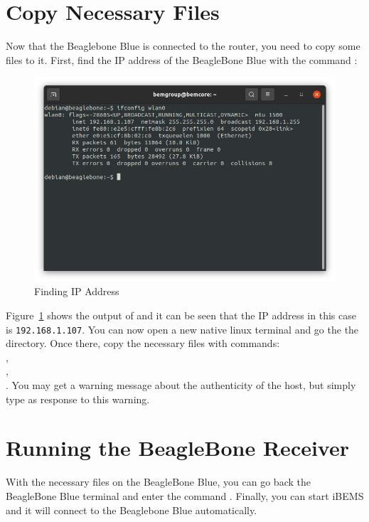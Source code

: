 \section{Copy Necessary Files}
Now that the Beaglebone Blue is connected to the router, you need to copy some files to it. First, find the IP address of the BeagleBone Blue with the command :

\begin{figure}[H]
\centering
\includegraphics[scale=0.4]{figs/beaglebone/findIPaddress.png}
\caption{Finding IP Address}
\label{fig:bb_findIP}
\end{figure}

Figure~\ref{fig:bb_findIP} shows the output of  and it can be seen that the IP address in this case is \texttt{192.168.1.107}.
\medbreak
You can now open a new native linux terminal and go the the  directory. Once there, copy the necessary files with commands:
\\
,
\\
,
\\
.
You may get a warning message about the authenticity of the host, but simply type  as response to this warning.

\section{Running the BeagleBone Receiver}
With the necessary files on the BeagleBone Blue, you can go back the BeagleBone Blue terminal and enter the command . Finally, you can start iBEMS and it will connect to the Beaglebone Blue automatically.
